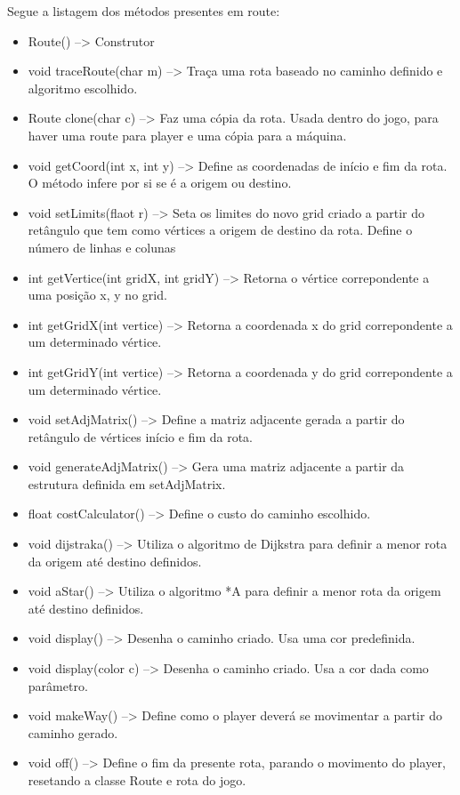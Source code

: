 \documentclass[
	12pt,				%
	oneside,			%
	a4paper,			%
	english,			%
	brazil,				%
	]{abntex2}
\begin{document}
{Segue a listagem dos métodos presentes em route:
\begin{itemize}
    \item Route() --> Construtor
    \item void traceRoute(char m) --> Traça uma rota baseado no caminho definido e algoritmo escolhido.
    \item Route clone(char c) --> Faz uma cópia da rota. Usada dentro do jogo, para haver uma route para player e uma cópia para a máquina.
    \item void getCoord(int x, int y) --> Define as coordenadas de início e fim da rota. O método infere por si se é a origem ou destino.
    \item void setLimits(flaot r) --> Seta os limites do novo grid criado a partir do retângulo que tem como vértices a origem de destino da rota. Define o número de linhas e colunas
    \item int getVertice(int gridX, int gridY) --> Retorna o vértice correpondente a uma posição x, y no grid.
    \item int getGridX(int vertice) --> Retorna a coordenada x do grid correpondente a um determinado vértice.
    \item int getGridY(int vertice) --> Retorna a coordenada y do grid correpondente a um determinado vértice.
    \item void setAdjMatrix() --> Define a matriz adjacente gerada a partir do retângulo de vértices início e fim da rota.
    \item void generateAdjMatrix() --> Gera uma matriz adjacente a partir da estrutura definida em setAdjMatrix.
    \item float costCalculator() --> Define o custo do caminho escolhido.
    \item void dijstraka() --> Utiliza o algoritmo de Dijkstra para definir a menor rota da origem até destino definidos.
    \item void aStar() --> Utiliza o algoritmo *A para definir a menor rota da origem até destino definidos.
    \item void display() --> Desenha o caminho criado. Usa uma cor predefinida.
    \item void display(color c) --> Desenha o caminho criado. Usa a cor dada como parâmetro.
    \item void makeWay() --> Define como o player deverá se movimentar a partir do caminho gerado.
    \item void off() --> Define o fim da presente rota, parando o movimento do player, resetando a classe Route e rota do jogo.
\end{itemize}

}
\end{document}
